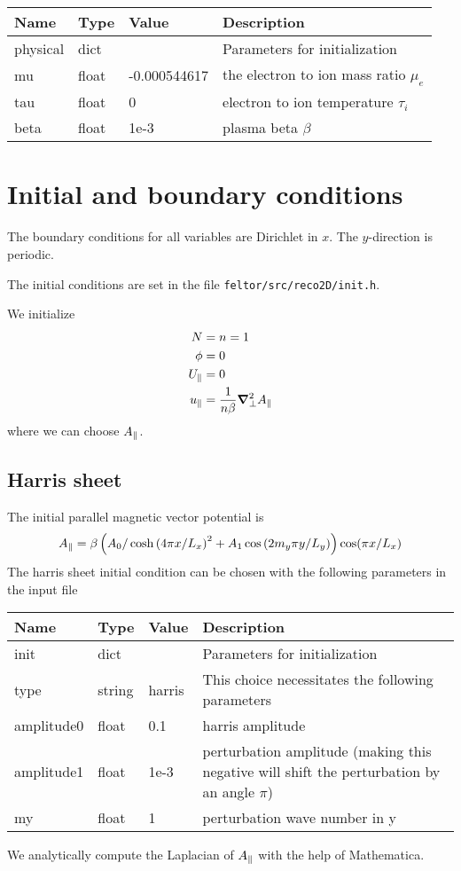 \begin{longtable}{llll}
\toprule
\rowcolor{gray!50}\textbf{Name} &  \textbf{Type} & \textbf{Value}  & \textbf{Description}  \\ \midrule
physical &  dict &   & Parameters for initialization \\
\qquad mu      & float & -0.000544617 & the electron to ion mass ratio $\mu_e$ \\
\qquad tau  & float &  0    &  electron to ion temperature $\tau_i$ \\
\qquad beta  & float &  1e-3    &  plasma beta $\beta$ \\
\bottomrule
\end{longtable}

\section{Initial and boundary conditions}
The boundary conditions for all variables are Dirichlet in $x$.
The $y$-direction is periodic.

The initial conditions are set in the file \texttt{feltor/src/reco2D/init.h}.

We initialize
\begin{align}
 N&=n =1 \\
 \phi &= 0 \\
  U_\parallel&=0 \\
  u_\parallel &= \frac{1}{n  \beta }{\boldsymbol{\nabla}}^2_{\perp} A_\parallel
\end{align}
where we can choose $A_\parallel$.
\subsection{Harris sheet}
The initial parallel magnetic vector potential is
\begin{align}
    A_\parallel =\beta\left( A_0 / \cosh{( 4  \pi x / L_x )}^2 +A_1\cos{(2 m_y\pi y/L_y)}\right) \cos( \pi x /L_x)
\end{align}
The harris sheet initial condition can be chosen with the following parameters in the input file
\begin{longtable}{llll}
\toprule
\rowcolor{gray!50}\textbf{Name} &  \textbf{Type} & \textbf{Value}  & \textbf{Description}  \\ \midrule
init &  dict &   & Parameters for initialization \\
\qquad type      & string & harris & This choice necessitates the following parameters \\
\qquad amplitude0  & float &  0.1     &  harris amplitude \\
\qquad amplitude1  & float &  1e-3    &  perturbation amplitude (making this negative will shift the perturbation by an angle $\pi$) \\
\qquad my          & float &  1       &  perturbation wave number in y\\
\bottomrule
\end{longtable}
We analytically compute the Laplacian of $A_\parallel$ with the help of Mathematica.
